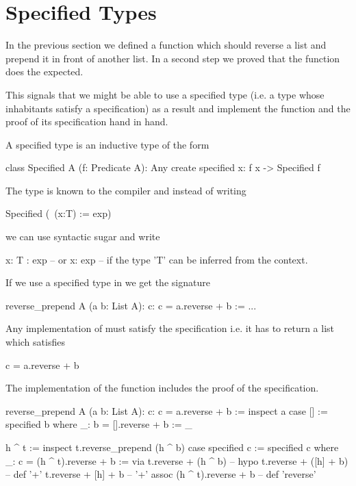 \section{Specified Types}

In the previous section we defined a function  which
should reverse a list and prepend it in front of another list. In a second
step we proved that the function does the expected.

This signals that we might be able to use a specified type (i.e. a type whose
inhabitants satisfy a specification) as a result and implement the function
and the proof of its specification hand in hand.

A specified type is an inductive type of the form
%
\begin{alba}
   class Specified A (f: Predicate A): Any create
     specified x: f x -> Specified f
\end{alba}

The type  is known to the compiler and instead of writing
%
\begin{alba}
  Specified (\ (x:T) := exp)
\end{alba}
%
we can use syntactic sugar and write
%
\begin{alba}
  {x: T : exp}
  -- or
  {x: exp}     -- if the type 'T' can be inferred from the context.
\end{alba}


If we use a specified type in  we get the signature
\begin{alba}
  reverse_prepend A (a b: List A): {c: c = a.reverse + b} :=
    ...
\end{alba}

Any implementation of  must satisfy the specification
i.e. it has to return a list  which satisfies
\begin{alba}
  c = a.reverse + b
\end{alba}


The implementation of the function includes the proof of the specification.

\begin{alba}
  reverse_prepend A (a b: List A): {c: c = a.reverse + b} :=
    inspect a case
      [] :=
        specified b where
          _: b = [].reverse + b := _

      h ^ t :=
        inspect t.reverse_prepend (h ^ b) case
          specified c :=
            specified c where
              _: c = (h ^ t).reverse + b :=
                via t.reverse + (h ^ b)      -- hypo
                    t.reverse + ([h] + b)    -- def '+'
                    t.reverse + [h] + b      -- '+' assoc
                    (h ^ t).reverse + b      -- def 'reverse'
\end{alba}


